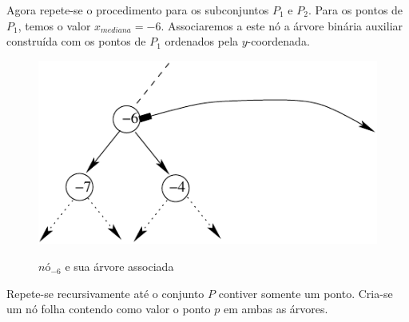 Agora repete-se o procedimento para os subconjuntos $P_1$ e $P_2$.
Para os pontos de $P_1$, temos o valor $x_{mediana} = -6$. Associaremos a este nó a árvore binária auxiliar
construída com os pontos de $P_1$ ordenados pela $y$-coordenada.
\begin{figure}[H]
\centering
\begin{minipage}{.5\textwidth}
  \centering
  \includegraphics[width=.8\linewidth]{images/range_tree3.pdf}

  \label{fig:test1}
\end{minipage}%
\begin{minipage}{.5\textwidth}
  \centering
  
  \label{fig:test2}
 
\end{minipage}
 \caption{$nó_{-6}$ e sua árvore associada}
\end{figure}


Repete-se recursivamente  até o conjunto $P$ contiver somente um ponto.
Cria-se um nó folha contendo como valor o ponto $p$ em ambas as árvores.

